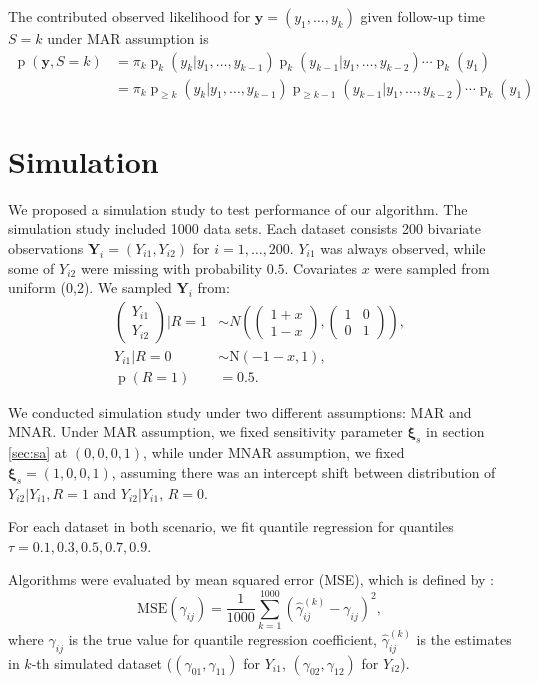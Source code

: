 \documentclass[12pt]{article}
\DeclareMathOperator{\pr}{p}
\begin{document}
The contributed observed likelihood for $\bm y = (y_1, \ldots, y_k)$
given follow-up time $S = k$ under MAR assumption is
\begin{align*}
  \pr(\bm y, S=k) & = \pi_k\pr_k (y_k | y_1, \ldots, y_{k-1}) \pr_k (y_{k-1}|y_1, \ldots, y_{k-2}) \cdots \pr_{k} (y_1) \\
  & = \pi_k \pr_{\geq k} (y_k | y_1, \ldots, y_{k-1}) \pr_{\geq k-1}
  (y_{k-1}|y_1, \ldots, y_{k-2}) \cdots \pr_{k} (y_1)
\end{align*}

\section{Simulation}
\label{sec:simulation}
We proposed a simulation study to test performance of our
algorithm. The simulation study included 1000 data sets. Each dataset
consists 200 bivariate observations $\bm Y_i = (Y_{i1}, Y_{i2})$ for
$i = 1, \ldots, 200$. $Y_{i1}$ was always observed, while some of
$Y_{i2}$ were missing with probability $0.5$. Covariates $x$ were
sampled from uniform (0,2). We sampled $\bm Y_i$ from:
\begin{align*}
  \begin{pmatrix}
    Y_{i1}\\
    Y_{i2}
  \end{pmatrix}
  \Big |R = 1 & \sim N \left(
    \begin{pmatrix}
      1 + x\\
      1 - x
    \end{pmatrix},
    \begin{pmatrix}
      1& 0 \\
      0 & 1
    \end{pmatrix} \right), \\
  Y_{i1} | R = 0 & \sim \textrm{N}(-1-x, 1) , \\
  \pr (R = 1) & = 0.5.
\end{align*}

We conducted simulation study under two different assumptions: MAR and
MNAR. Under MAR assumption, we fixed sensitivity parameter $\bm \xi_s$
in section \ref{sec:sa} at $(0, 0, 0, 1)$, while under MNAR
assumption, we fixed $\bm \xi_s = (1, 0, 0, 1)$, assuming there was an
intercept shift between distribution of $Y_{i2}|Y_{i1}, R = 1$ and
$Y_{i2}|Y_{i1}$, $R = 0$.

For each dataset in both scenario, we fit quantile regression for
quantiles $\tau = 0.1, 0.3, 0.5, 0.7, 0.9$.

Algorithms were evaluated by mean squared error (MSE), which is
defined by :
\begin{equation}
  \label{eq:eval}
  \text{MSE} (\gamma_{ij}) = \frac{1}{1000} \sum_{k = 1}^{1000} \left( \hat{\gamma}_{ij}^{(k)}  - \gamma_{ij}\right)^2,
\end{equation}
where $\gamma_{ij}$ is the true value for quantile regression
coefficient, $\hat{\gamma}_{ij}^{(k)}$ is the estimates in $k$-th
simulated dataset ($(\gamma_{01}, \gamma_{11})$ for $Y_{i1}$,
$(\gamma_{02}, \gamma_{12})$ for $Y_{i2}$).
\end{document}
